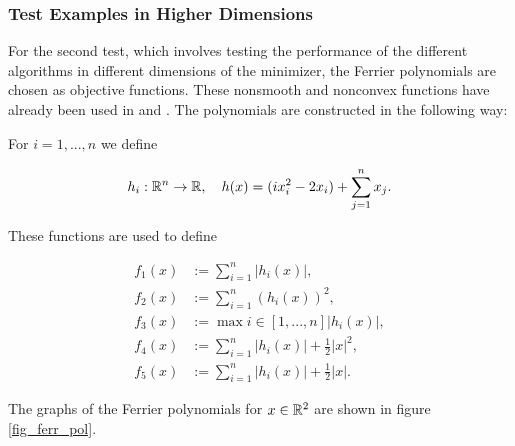 
\subsubsection{Test Examples in Higher Dimensions}
\label{sec_num_test_ferr}

For the second test, which involves testing the performance of the different algorithms in different dimensions of the minimizer, the Ferrier polynomials are chosen as objective functions. These nonsmooth and nonconvex functions have already been used in \cite{Hare2010} and \cite{Hare2016}. The polynomials are constructed in the following way:

For \(i = 1,...,n\) we define 

\begin{align*}
	h_i: \mathbb{R}^n \to \mathbb{R}, \quad h(x) = (ix_i^2-2x_i)+\sum_{j=1}^n x_j.
\end{align*}

These functions are used to define

\begin{align*}
	f_1(x) &:= \sum_{i=1}^n |h_i(x)|, \\
	f_2(x) &:= \sum_{i=1}^n (h_i(x))^2, \\
	f_3(x) &:= \max{i \in [1,...,n]}|h_i(x)|, \\
	f_4(x) &:= \sum_{i=1}^n |h_i(x)|+\frac{1}{2}|x|^2, \\
	f_5(x) &:= \sum_{i=1}^n |h_i(x)|+\frac{1}{2}|x|.
\end{align*}


The graphs of the Ferrier polynomials for \(x \in \mathbb{R}^2\) are shown in figure \ref{fig_ferr_pol}.

